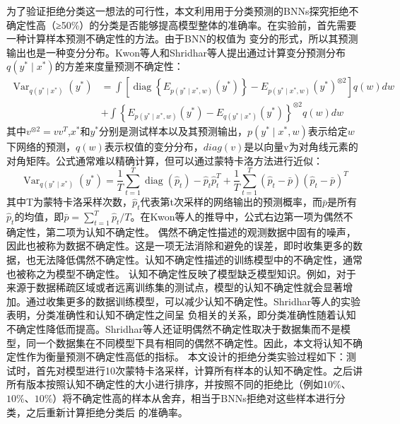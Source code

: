 为了验证拒绝分类这一想法的可行性，本文利用用于分类预测的BNNs探究拒绝不确定性高（≥50\%）的分类是否能够提高模型整体的准确率。在实验前，首先需要一种计算样本预测不确定性的方法。由于BNN的权值为
变分的形式，所以其预测输出也是一种变分分布。Kwon等人\cite{kwon2020uncertainty}和Shridhar等人\cite{shridhar2018uncertainty}提出通过计算变分预测分布$q\left(y^* \mid x^*\right)$的方差来度量预测不确定性：
\begin{equation}
	\label{}
	\begin{aligned}
	\operatorname{Var}_{q\left(y^* \mid x^*\right)}\left(y^*\right) & =\int\left[\operatorname{diag}\left\{E_{p\left(y^* \mid x^*, w\right)}\left(y^*\right)\right\}-E_{p\left(y^* \mid x^*, w\right)}\left(y^*\right)^{\otimes 2}\right] q(w) d w \\
	& +\int\left\{E_{p\left(y^* \mid x^*, w\right)}\left(y^*\right)-E_{q\left(y^* \mid x^*\right)}\left(y^*\right)\right\}^{\otimes 2} q(w) d w
	\end{aligned}
\end{equation}
其中$v^{\otimes 2} = vv^{T}$,$x^{*}$和$y^{*}$分别是测试样本以及其预测输出，$p\left(y^* \mid x^*, w\right)$表示给定$w$下网络的预测，$q(w)$表示权值的变分分布，$diag(v)$是以向量v为对角线元素的
对角矩阵。公式通常难以精确计算，但可以通过蒙特卡洛方法进行近似\cite{}：
\begin{equation}
	\label{}
	\operatorname{Var}_{q\left(y^* \mid x^*\right)}\left(y^*\right)=\frac{1}{T} \sum_{t=1}^T \operatorname{diag}\left(\hat{p}_t\right)-\hat{p}_t \hat{p}_t^T+\frac{1}{T} \sum_{t=1}^T\left(\hat{p}_t-\bar{p}\right)\left(\hat{p}_t-\bar{p}\right)^T
\end{equation}
其中T为蒙特卡洛采样次数，$\hat{p}_t$代表第t次采样的网络输出的预测概率，而$\bar{p}$是所有$\hat{p}_t$的均值，即$\bar{p}=\sum_{t=1}^T \hat{p}_t / T$。在Kwon等人\cite{kwon2020uncertainty}的推导中，公式右边第一项为偶然不确定性，第二项为认知不确定性。
偶然不确定性描述的观测数据中固有的噪声，因此也被称为数据不确定性。这是一项无法消除和避免的误差，即时收集更多的数据，也无法降低偶然不确定性。认知不确定性描述的训练模型中的不确定性，通常也被称之为模型不确定性。
认知不确定性反映了模型缺乏模型知识。例如，对于来源于数据稀疏区域或者远离训练集的测试点，模型的认知不确定性就会显著增加\cite{kendall2017uncertainties}。通过收集更多的数据训练模型，可以减少认知不确定性。Shridhar等人\cite{shridhar2018uncertainty}的实验表明，分类准确性和认知不确定性之间呈
负相关的关系，即分类准确性随着认知不确定性降低而提高。Shridhar等人\cite{shridhar2018uncertainty}还证明偶然不确定性取决于数据集而不是模型，同一个数据集在不同模型下具有相同的偶然不确定性。因此，本文将认知不确定性作为衡量预测不确定性高低的指标。
本文设计的拒绝分类实验过程如下：测试时，首先对模型进行10次蒙特卡洛采样，计算所有样本的认知不确定性。之后讲所有版本按照认知不确定性的大小进行排序，并按照不同的拒绝比（例如$10\%$、$10\%$、$10\%$）将不确定性高的样本从舍弃，相当于BNNs拒绝对这些样本进行分类，之后重新计算拒绝分类后
的准确率。


